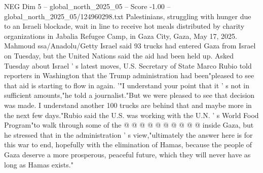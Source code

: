 \begin{textsample}{NEG Dim 5 – global\_north\_2025\_05 – Score -1.00 – global\_north\_2025\_05/124960298.txt}
Palestinians, struggling with hunger due to an Israeli blockade, wait in line to receive hot meals distributed by charity organizations in Jabalia Refugee Camp, in Gaza City, Gaza, May 17, 2025.
Mahmoud ssa/Anadolu/Getty Israel said 93 trucks had entered Gaza from Israel on Tuesday, but the United Nations said the aid had been held up.
Asked Tuesday about Israel ' s latest moves, U.S.
Secretary of State Marco Rubio told reporters in Washington that the Trump administration had been"pleased to see that aid is starting to flow in again. '"I understand your point that it ' s not in sufficient amounts,"he told a journalist."But we were pleased to see that decision was made.
I understand another 100 trucks are behind that and maybe more in the next few days."Rubio said the U.S. was working with the U.N. ' s World Food Program"to walk through some of the @ @ @ @ @ @ @ @ @ @ inside Gaza, but he stressed that in the administration ' s view,"ultimately the answer here is for this war to end, hopefully with the elimination of Hamas, because the people of Gaza deserve a more prosperous, peaceful future, which they will never have as long as Hamas exists."

\end{textsample}
